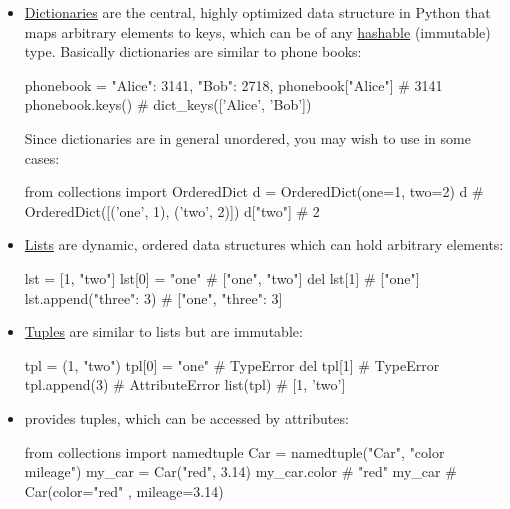 \documentclass[rules]{cheatsheet}
\begin{document}
\begin{itemize}
  \item \href{https://docs.python.org/3/library/stdtypes.html#typesmapping}{Dictionaries} are the central, highly optimized data structure in Python that maps arbitrary elements to keys, which can be of any \href{https://docs.python.org/3/glossary.html#term-hashable}{hashable} (immutable) type. Basically dictionaries are similar to phone books:
  \begin{python}[gobble=4]
    phonebook = {
      "Alice": 3141,
      "Bob": 2718,
    }
    phonebook["Alice"] # 3141
    phonebook.keys() # dict_keys(['Alice', 'Bob'])
  \end{python}
  Since dictionaries are in general unordered, you may wish to use \href{https://docs.python.org/3.7/library/collections.html#collections.OrderedDict}{} in some cases:
  \begin{python}[gobble=4]
    from collections import OrderedDict
    d = OrderedDict(one=1, two=2)
    d # OrderedDict([('one', 1), ('two', 2)])
    d["two"] # 2
  \end{python}

  \item \href{https://docs.python.org/3/library/stdtypes.html#list}{Lists} are dynamic, ordered data structures which can hold arbitrary elements:
  \begin{python}[gobble=4]
    lst = [1, "two"]
    lst[0] = "one" # ["one", "two"]
    del lst[1] # ["one"]
    lst.append({"three": 3}) # ["one", {"three": 3}]
  \end{python}

  \item \href{https://docs.python.org/3/library/stdtypes.html#tuple}{Tuples} are similar to lists but are immutable:
  \begin{python}[gobble=4]
    tpl = (1, "two")
    tpl[0] = "one" # TypeError
    del tpl[1] # TypeError
    tpl.append(3) # AttributeError
    list(tpl) # [1, 'two']
  \end{python}

  \item \href{https://docs.python.org/3/library/collections.html#collections.namedtuple}{} provides tuples, which can be accessed by attributes:
  \begin{python}[gobble=4]
    from collections import namedtuple
    Car = namedtuple("Car", "color mileage")
    my_car = Car("red", 3.14)
    my_car.color # "red"
    my_car # Car(color="red" , mileage=3.14)
  \end{python}


\end{itemize}
\end{document}
